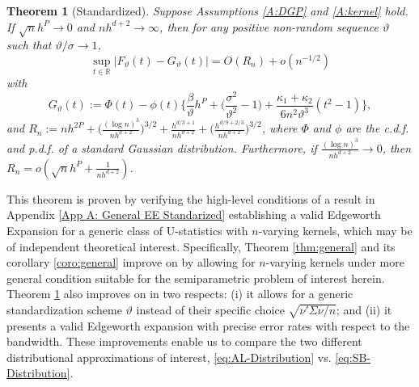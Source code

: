 \documentclass[11pt]{article}
\newtheorem{thm}{Theorem}
\numberwithin{equation}{section}
\theoremstyle{definition}
\newcommand{\R}{\mathbb{R}}
\newcommand{\Scale}{\vartheta}
\begin{document}
\begin{thm}[Standardized] \label{thm:EE-standard}
    Suppose Assumptions \ref{A:DGP} and \ref{A:kernel} hold. If $\sqrt{n}h^P\to 0$ and $nh^{d+2}\to\infty$, then for any positive non-random sequence $\Scale$ such that $\Scale/\sigma\to 1$,
    \[\sup_{t\in \R}\big|F_\Scale(t)- G_\Scale(t)\big| = O(R_n) + o(n^{-1/2})\]
    with
    \[G_\Scale(t) := \Phi(t) -\phi(t)\Big\{\frac{\beta}{\Scale}h^P + \Big(\frac{\sigma^2}{\Scale^2} -1\Big) + \frac{\kappa_1+\kappa_2}{6n^2\Scale^3}(t^2-1)\Big\},\]
    and $R_n := nh^{2P} + \Big(\frac{(\log n)^{3}}{nh^{d+2}}\Big)^{3/2} + \frac{h^{d/3+1}}{nh^{d+2}} + \Big(\frac{h^{d/9+2/3}}{nh^{d+2}}\Big)^{3/2}$, where $\Phi$ and $\phi$ are the c.d.f. and p.d.f. of a standard Gaussian distribution. Furthermore, if $\frac{(\log n)^{3}}{nh^{d+2}}\to 0$, then $R_n = o\left(\sqrt{n} h^P + \tfrac{1}{nh^{d+2}}\right)$.
\end{thm}
This theorem is proven by verifying the high-level conditions of a result in Appendix \ref{App A: General EE Standarized} establishing a valid Edgeworth Expansion for a generic class of U-statistics with $n$-varying kernels, which may be of independent theoretical interest. Specifically, Theorem \ref{thm:general} and its corollary \ref{coro:general} improve on \citet{Jing-Wang_2003_AOS} by allowing for $n$-varying kernels under more general condition suitable for the semiparametric problem of interest herein. Theorem \ref{thm:EE-standard} also improves on \citet[Theorem 1]{Nishiyama-Robinson_2000_ECMA} in two respects: (i) it allows for a generic standardization scheme $\Scale$ instead of their specific choice $\sqrt{\nu'\Sigma\nu/n}$; and (ii) it presents a valid Edgeworth expansion with precise error rates with respect to the bandwidth. These improvements enable us to compare the two different distributional approximations of interest, \eqref{eq:AL-Distribution} vs. \eqref{eq:SB-Distribution}.
\end{document}
